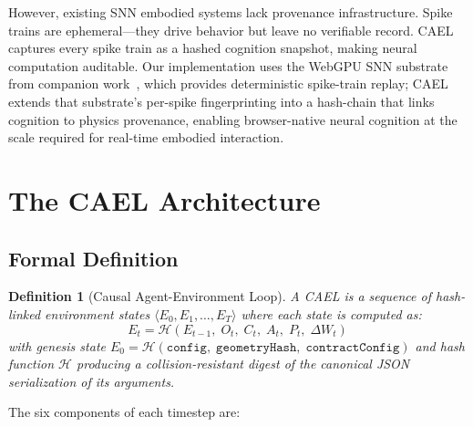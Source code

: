 \documentclass[sigconf,nonacm]{acmart}
\newtheorem{definition}{Definition}
\newcommand{\caelstate}[1]{E_{#1}}
\newcommand{\percept}[1]{O_{#1}}
\newcommand{\cognit}[1]{C_{#1}}
\newcommand{\action}[1]{A_{#1}}
\newcommand{\physics}[1]{P_{#1}}
\newcommand{\worldd}[1]{\Delta W_{#1}}
\newcommand{\hashfn}{\mathcal{H}}
\begin{document}
However, existing SNN embodied systems lack provenance infrastructure.
Spike trains are ephemeral---they drive behavior but leave no
verifiable record. CAEL captures every spike train as a hashed
cognition snapshot, making neural computation auditable. Our
implementation uses the WebGPU SNN substrate from companion work~\cite{snn-paper},
which provides deterministic spike-train replay; CAEL extends that substrate's
per-spike fingerprinting into a hash-chain that links cognition to physics
provenance, enabling browser-native neural cognition at the scale required
for real-time embodied interaction.


\section{The CAEL Architecture}
\label{sec:architecture}

\subsection{Formal Definition}

\begin{definition}[Causal Agent-Environment Loop]
\label{def:cael}
A CAEL is a sequence of hash-linked environment states
$\langle \caelstate{0}, \caelstate{1}, \ldots, \caelstate{T} \rangle$
where each state is computed as:
\begin{equation}
\label{eq:cael}
\caelstate{t} = \hashfn\!\left(\caelstate{t-1},\; \percept{t},\;
  \cognit{t},\; \action{t},\; \physics{t},\; \worldd{t}\right)
\end{equation}
with genesis state $\caelstate{0} = \hashfn(\texttt{config},\;
\texttt{geometryHash},\; \texttt{contractConfig})$ and hash function
$\hashfn$ producing a collision-resistant digest of the canonical
JSON serialization of its arguments.
\end{definition}

The six components of each timestep are:
\end{document}
